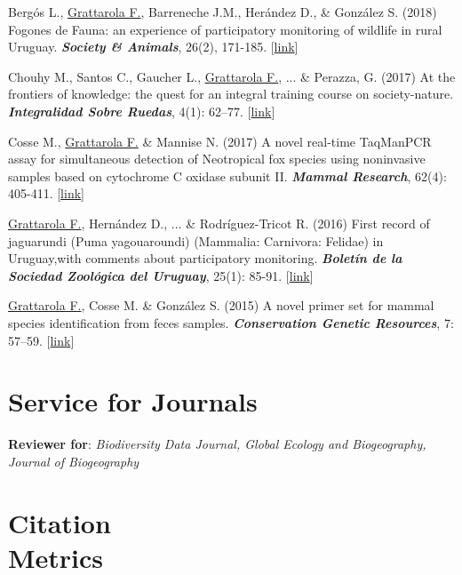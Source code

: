 \begin{etaremune}
\item Bergós L., \underline{Grattarola F.}, Barreneche J.M., Herández D., \& González S. (2018) Fogones de Fauna: an experience of participatory monitoring of wildlife in rural Uruguay. \textit{\textbf{Society \& Animals}}, 26(2), 171-185. [\href{https://doi.org/10.1163/15685306-12341497}{link}]

\item Chouhy M., Santos C., Gaucher L., \underline{Grattarola F.}, ... \& Perazza, G. (2017) At the frontiers of knowledge: the quest for an integral training course on society-nature. \textit{\textbf{Integralidad Sobre Ruedas}}, 4(1): 62–77. [\href{https://ojs.fhce.edu.uy/index.php/insoru/article/view/234}{link}]

\item Cosse M., \underline{Grattarola F.}  \& Mannise N. (2017) A novel real-time TaqMan\texttrademark PCR assay for simultaneous detection of Neotropical fox species using noninvasive samples based on cytochrome C oxidase subunit II. \textit{\textbf{Mammal Research}}, 62(4): 405-411. [\href{https://doi.org/10.1007/s13364-017-0328-y}{link}]

\item \underline{Grattarola F.}, Hernández D., ... \& Rodríguez-Tricot R. (2016) First record of jaguarundi (Puma yagouaroundi) (Mammalia: Carnivora: Felidae) in Uruguay,with comments about  participatory monitoring. \textit{\textbf{Boletín de la Sociedad Zoológica del Uruguay}}, 25(1): 85-91. [\href{http://szu.org.uy/journal/index.php/Bol_SZU/article/view/23}{link}]

\item \underline{Grattarola F.}, Cosse M. \& González S. (2015) A novel primer set for mammal species identification from feces samples. \textit{\textbf{Conservation Genetic Resources}}, 7: 57–59. [\href{https://doi.org/10.1007/s12686-014-0359-5}{link}]

\end{etaremune}

\HRule

\section{Service for Journals}

{\bf Reviewer for}: \textit{Biodiversity Data Journal, Global Ecology and Biogeography, Journal of Biogeography}

\HRule

\section{Citation \\ Metrics}

